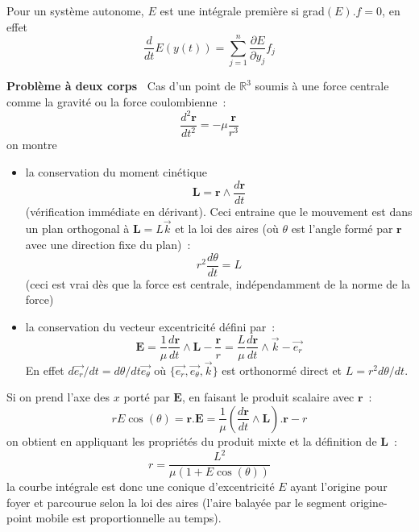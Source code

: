 \documentclass[a4paper,11pt]{article}
\begin{document}
\begin{giacjshere}
Pour un syst\`eme autonome, $E$ est une int\'egrale premi\`ere si
grad$(E).f=0$, en effet
$$ \frac{d}{dt} E(y(t))= \sum_{j=1}^n \frac{\partial E}{\partial y_j} f_j$$

{\bf Probl\`eme \`a deux corps~} 
Cas d'un point de $\mathbb{R}^3$
soumis \`a une force centrale
comme la gravit\'e ou la force coulombienne~:
$$\frac{d^2 {\mathbf r}}{dt^2}=-\mu \frac{{\mathbf r}}{r^3}$$ 
on montre
\begin{itemize}
\item  la conservation du moment cin\'etique 
$${\mathbf L}=
{\mathbf r} \wedge \frac{d {\mathbf r}}{dt}$$
(v\'erification imm\'ediate en d\'erivant).
Ceci entraine que
le mouvement est dans un plan orthogonal \`a 
${\mathbf L}=L \overrightarrow{k}$
et la loi des aires (o\`u $\theta$ est l'angle form\'e par 
${\mathbf r}$ avec une direction fixe du plan)~:
$$r^2 \frac{d\theta}{dt}=L$$
(ceci est vrai d\`es que la force est centrale, ind\'ependamment
de la norme de la force)
\item la conservation du vecteur excentricit\'e d\'efini par~:
\[ {\mathbf E}= \frac{1}{\mu} \frac{d{\mathbf r}}{dt} \wedge 
{\mathbf L} - \frac{{\mathbf r}}{r} 
= \frac{L }{\mu} \frac{d{\mathbf r}}{dt} \wedge 
\overrightarrow{k} - \overrightarrow{e_r} \]
En effet $d \overrightarrow{e_r}/dt=d\theta/dt
\overrightarrow{e_\theta}$ o\`u $\{ \overrightarrow{e_r},
\overrightarrow{e_\theta}, \overrightarrow{k} \}$ est orthonorm\'e direct
et $L=r^2 d\theta/dt$.
\end{itemize}
Si on prend l'axe des $x$ port\'e par ${\mathbf E}$,
en faisant le produit scalaire avec ${\mathbf r}$~:
$$rE \cos(\theta)={\mathbf r}.{\mathbf E}
= \frac{1}{\mu} 
(\frac{d{\mathbf r}}{dt} \wedge {\mathbf L}) . {\mathbf r} - r$$
on obtient en appliquant les propri\'et\'es du produit mixte et la
d\'efinition de ${\mathbf L}$~:
\[ r = \frac{L^2}{\mu(1+E \cos(\theta))}\]
la courbe int\'egrale est donc une conique d'excentricit\'e $E$
ayant l'origine pour foyer et parcourue selon la loi des aires
(l'aire balay\'ee par le segment origine-point mobile est
proportionnelle au temps).


\end{giacjshere}
\end{document}
